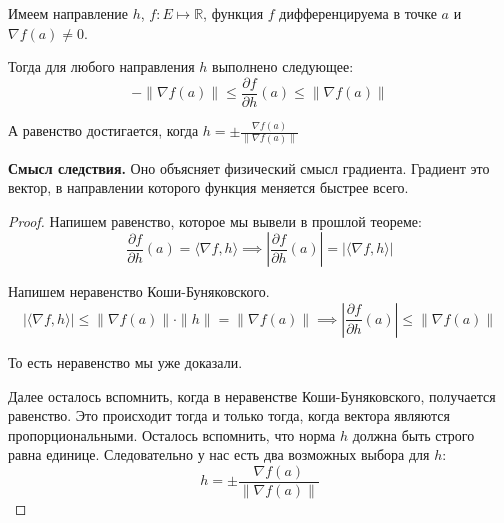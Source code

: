 \begin{consequence} \thmslashn
	
	Имеем направление $ h $, $ f : E \mapsto \mathbb{R} $, функция $ f $ дифференцируема в точке $ a $ и $ \nabla f(a) \neq 0 $.
	
	Тогда для любого направления $ h $ выполнено следующее: 
	\[
	- \| \nabla f(a) \| \leq \frac{\partial f}{\partial h} (a) \leq \| \nabla f(a) \|
	\]
	
	А равенство достигается, когда $ h = \pm \frac{\nabla f(a)}{\|\nabla f(a) \|} $
	
	\leavevmode \linebreak
	\textbf{Смысл следствия.} Оно объясняет физический смысл градиента. Градиент это вектор, в направлении которого функция меняется быстрее всего.
	
	\begin{proof} \thmslashn
		
		Напишем равенство, которое мы вывели в прошлой теореме:
		\[
		\frac{\partial f}{\partial h} (a) = \langle \nabla f, h \rangle \implies
		| \frac{\partial f}{\partial h} (a) | = | \langle \nabla f, h \rangle |
		\]
		
		Напишем неравенство Коши-Буняковского. 
		\[
		| \langle \nabla f, h \rangle | \leq \| \nabla f(a) \| \cdot \| h \| = \| \nabla f(a) \| \implies
		| \frac{\partial f}{\partial h} (a) | \leq \| \nabla f(a) \|        
		\] 
		
		То есть неравенство мы уже доказали. 
		
		Далее осталось вспомнить, когда в неравенстве Коши-Буняковского, получается равенство. Это происходит тогда и только тогда, когда вектора являются пропорциональными. Осталось вспомнить, что норма $ h $ должна быть строго равна единице. Следовательно у нас есть два возможных выбора для $ h $:
		\[
		h = \pm \frac{\nabla f(a)}{\|\nabla f(a) \|}
		\]
		
	\end{proof}
	
\end{consequence}






